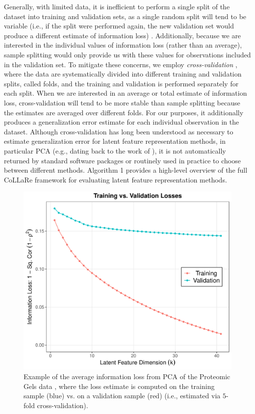 Generally, with limited data, it is inefficient to perform a single split of the dataset into training and validation sets, as a single random split will tend to be variable (i.e., if the split were performed again, the new validation set would produce a different estimate of information loss) \parencite[Table 1]{collins_evaluation_2024}.
Additionally, because we are interested in the individual values of information loss (rather than an average), sample splitting would only provide us with these values for observations included in the validation set. 
To mitigate these concerns, we employ \emph{cross-validation} \parencite{stone_cross-validatory_1974}, where the data are systematically divided into different training and validation splits, called folds, and the training and validation is performed separately for each split.
When we are interested in an average or total estimate of information loss, cross-validation will tend to be more stable than sample splitting because the estimates are averaged over different folds.
For our purposes, it additionally produces a generalization error estimate for each individual observation in the dataset.
Although cross-validation has long been understood as necessary to estimate generalization error for latent feature representation methods, in particular PCA (e.g., dating back to the work of \textcite{wold_cross-validatory_1978, eastment_cross-validatory_1982, krzanowski_cross-validation_1987}), it is not automatically returned by standard software packages or routinely used in practice to choose between different methods.
Algorithm 1 provides a high-level overview of the full CoLLaRe framework for evaluating latent feature representation methods.

\begin{figure}
    \centering
    \includegraphics[width=0.5\linewidth]{figures/training-validation.pdf}
    \caption{Example of the average information loss from PCA of the Proteomic Gels data \parencite{morris_pinnacle_2008}, where the loss estimate is computed on the training sample (blue) vs. on a validation sample (red) (i.e., estimated via $5$-fold cross-validation).}
    \label{fig:training-validation}
\end{figure}


